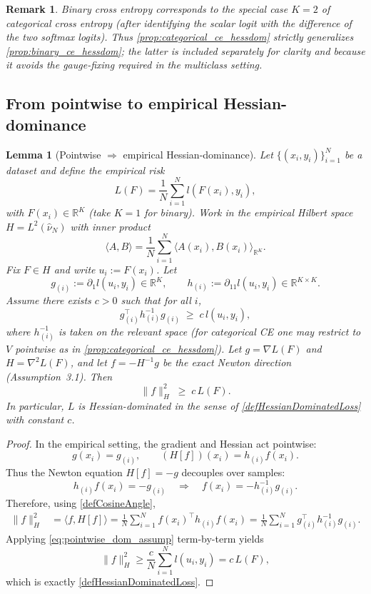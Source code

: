 \documentclass{article}
\theoremstyle{plain}
\newtheorem{lemma}[theorem]{Lemma}
\newtheorem{remark}[theorem]{Remark} %
\theoremstyle{definition}
\theoremstyle{remark}
\begin{document}
\begin{remark}
Binary cross entropy corresponds to the special case $K=2$ of categorical
cross entropy (after identifying the scalar logit with the difference of the
two softmax logits). Thus \cref{prop:categorical_ce_hessdom}
strictly generalizes \cref{prop:binary_ce_hessdom}; the latter is
included separately for clarity and because it avoids the gauge-fixing
required in the multiclass setting.
\end{remark}

\subsection{From pointwise to empirical Hessian-dominance}

\begin{lemma}[Pointwise $\Rightarrow$ empirical Hessian-dominance]
\label{lem:pointwise_to_empirical_hessdom}
Let $\{(x_i,y_i)\}_{i=1}^N$ be a dataset and define the empirical risk
\[
L(F)=\frac{1}{N}\sum_{i=1}^N l(F(x_i),y_i),
\]
with $F(x_i)\in\mathbb{R}^K$ (take $K=1$ for binary). Work in the empirical Hilbert
space $H=L^2(\hat\nu_N)$ with inner product
\[
\langle A,B\rangle = \frac{1}{N}\sum_{i=1}^N \langle A(x_i),B(x_i)\rangle_{\mathbb{R}^K}.
\]
Fix $F\in H$ and write $u_i:=F(x_i)$. Let
\[
g_{(i)} := \partial_1 l(u_i,y_i)\in\mathbb{R}^K,\qquad
h_{(i)} := \partial_{11} l(u_i,y_i)\in\mathbb{R}^{K\times K}.
\]
Assume there exists $c>0$ such that for all $i$,
\begin{equation}
\label{eq:pointwise_dom_assump}
g_{(i)}^\top h_{(i)}^{-1} g_{(i)} \;\ge\; c\,l(u_i,y_i),
\end{equation}
where $h_{(i)}^{-1}$ is taken on the relevant space (for categorical CE one may restrict
to $V$ pointwise as in \cref{prop:categorical_ce_hessdom}).
Let $g=\nabla L(F)$ and $H=\nabla^2 L(F)$, and let $f=-H^{-1}g$ be the exact Newton
direction (Assumption~3.1). Then
\[
\|f\|_{H}^2 \;\ge\; c\,L(F).
\]
In particular, $L$ is Hessian-dominated in the sense of \cref{defHessianDominatedLoss} with constant $c$.
\end{lemma}

\begin{proof}
In the empirical setting, the gradient and Hessian act pointwise:
\[
g(x_i)=g_{(i)},\qquad (H[f])(x_i)=h_{(i)} f(x_i).
\]
Thus the Newton equation $H[f]=-g$ decouples over samples:
\[
h_{(i)} f(x_i)=-g_{(i)} \quad\Rightarrow\quad f(x_i)=-h_{(i)}^{-1}g_{(i)}.
\]
Therefore, using \cref{defCosineAngle},
\begin{align*}
\|f\|_{H}^2
&= \langle f,H[f]\rangle
= \frac{1}{N}\sum_{i=1}^N f(x_i)^\top h_{(i)} f(x_i)
= \frac{1}{N}\sum_{i=1}^N g_{(i)}^\top h_{(i)}^{-1} g_{(i)}.
\end{align*}
Applying \eqref{eq:pointwise_dom_assump} term-by-term yields
\[
\|f\|_{H}^2
\ge \frac{c}{N}\sum_{i=1}^N l(u_i,y_i)
= c\,L(F),
\]
which is exactly \cref{defHessianDominatedLoss}.
\end{proof}
\end{document}
